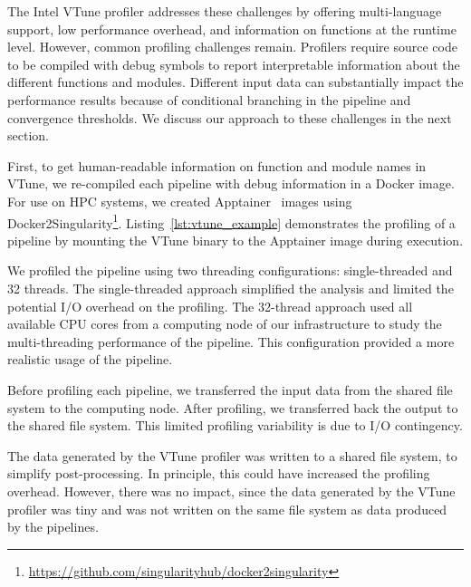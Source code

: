 \documentclass[conference]{IEEEtran}
\renewcommand{\lstlistingname}{Listing}
\begin{document}
The Intel VTune profiler addresses these challenges by offering multi-language support, low performance overhead, and information on functions at the runtime level. However, common profiling challenges remain. Profilers require source code to be compiled with debug symbols to report interpretable information about the different functions and modules. Different input data can substantially impact the performance results because of conditional branching in the pipeline and convergence thresholds. We discuss our approach to these challenges in the next section.

First, to get human-readable information on function and module names in VTune, we re-compiled each pipeline with debug information in a Docker image. For use on HPC systems, we created Apptainer~\cite{Kurtzer2017-bu} images using Docker2Singularity\footnote{\href{https://github.com/singularityhub/docker2singularity}{https://github.com/singularityhub/docker2singularity}}. \lstlistingname~\ref{lst:vtune_example} demonstrates the profiling of a pipeline by mounting the VTune binary to the Apptainer image during execution.

\begin{minipage}{0.9\linewidth}
	
\end{minipage}
			
We profiled the pipeline using two threading configurations: single-threaded and 32 threads. The single-threaded approach simplified the analysis and limited the potential I/O overhead on the profiling. The 32-thread approach used all available CPU cores from a computing node of our infrastructure to study the multi-threading performance of the pipeline. This configuration provided a more realistic usage of the pipeline.

Before profiling each pipeline, we transferred the input data from the shared file system to the computing node. After profiling, we transferred back the output to the shared file system. This limited profiling variability is due to I/O contingency. 

The data generated by the VTune profiler was written to a shared file system, to simplify post-processing. In principle, this could have increased the profiling overhead. However, there was no impact, since the data generated by the VTune profiler was tiny and was not written on the same file system as data produced by the pipelines. 
			 
\end{document}
